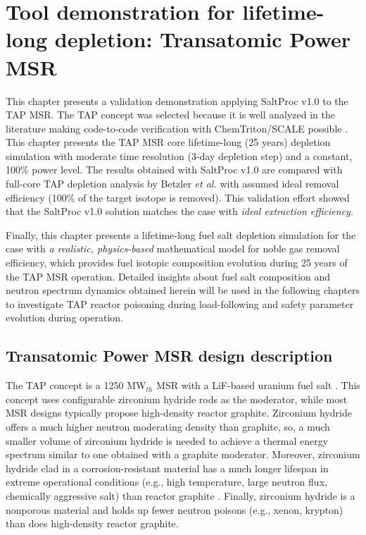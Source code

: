 \chapter{Tool demonstration for lifetime-long depletion: Transatomic Power MSR}

This chapter presents a validation demonstration applying SaltProc v1.0 to 
the \gls{TAP} \gls{MSR}. The \gls{TAP} concept was selected because it is well 
analyzed in the literature \cite{betzler_two-dimensional_2017, 
betzler_assessment_2017-1} making code-to-code verification with 
ChemTriton/SCALE possible \cite{betzler_assessment_2017-1}. This chapter 
presents the \gls{TAP} \gls{MSR} core lifetime-long (25 years) depletion 
simulation with moderate time resolution (3-day depletion step) and a 
constant, 100\% power level. The results obtained with SaltProc v1.0 are 
compared with full-core \gls{TAP} depletion analysis by Betzler \emph{et al.} 
\cite{betzler_assessment_2017-1} with assumed ideal removal efficiency (100\% 
of the target isotope is removed). This validation effort showed that the 
SaltProc v1.0 solution matches the case with \emph{ideal extraction 
efficiency}. 

Finally, this chapter presents a lifetime-long fuel salt depletion simulation 
for the case with \emph{a realistic, physics-based} mathematical model for 
noble gas removal efficiency, which provides fuel isotopic composition 
evolution during 25 years of the \gls{TAP} \gls{MSR} operation. Detailed 
insights about fuel salt composition and neutron spectrum dynamics obtained 
herein will be used in the following chapters to investigate \gls{TAP} 
reactor poisoning during load-following and safety parameter evolution during 
operation.


\section{Transatomic Power MSR design description}\label{sec:tap_design_sum}

The \gls{TAP} concept is a 1250 MW$_{th}$ \gls{MSR} with a LiF-based uranium 
fuel salt \cite{transatomic_power_corporation_technical_2016}. This concept 
uses configurable zirconium hydride rods as the moderator, while most 
\gls{MSR} designs typically propose high-density reactor graphite. Zirconium 
hydride offers a much higher neutron moderating density than graphite, so, a 
much smaller volume of zirconium hydride is needed to achieve a thermal energy 
spectrum similar to one obtained with a graphite moderator. Moreover, 
zirconium hydride clad in a corrosion-resistant material has a much longer 
lifespan in extreme operational conditions (e.g., high temperature, large 
neutron flux, chemically aggressive salt) than reactor graphite 
\cite{transatomic_power_corporation_lost_2018}. Finally, zirconium hydride is 
a nonporous material and holds up fewer neutron poisons (e.g., xenon, krypton) 
than does high-density reactor graphite.

